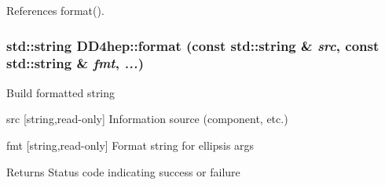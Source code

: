 References format().\hypertarget{namespace_d_d4hep_a9a97cc57d7225177b869138f63751ffc}{
\subsubsection[{format}]{\setlength{\rightskip}{0pt plus 5cm}std::string DD4hep::format (const std::string \& {\em src}, \/  const std::string \& {\em fmt}, \/   {\em ...})}}
\label{namespace_d_d4hep_a9a97cc57d7225177b869138f63751ffc}
Build formatted string \begin{DoxyItemize}
\item src \mbox{[}string,read-\/only\mbox{]} Information source (component, etc.) \item fmt \mbox{[}string,read-\/only\mbox{]} Format string for ellipsis args \begin{DoxyReturn}{Returns}
Status code indicating success or failure 
\end{DoxyReturn}
\end{DoxyItemize}


